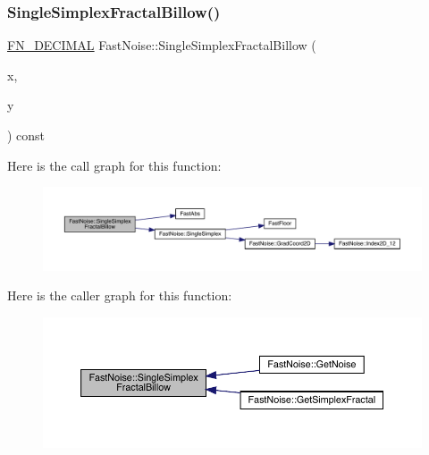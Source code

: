 \subsubsection{\texorpdfstring{Single\+Simplex\+Fractal\+Billow()}{SingleSimplexFractalBillow()}\hspace{0.1cm}{\footnotesize\ttfamily [1/2]}}
{\footnotesize\ttfamily \mbox{\hyperlink{_fast_noise_8h_a75a9ef6d2541c4921815b885bfd449c3}{F\+N\+\_\+\+D\+E\+C\+I\+M\+AL}} Fast\+Noise\+::\+Single\+Simplex\+Fractal\+Billow (\begin{DoxyParamCaption}\item[{\mbox{\hyperlink{_fast_noise_8h_a75a9ef6d2541c4921815b885bfd449c3}{F\+N\+\_\+\+D\+E\+C\+I\+M\+AL}}}]{x,  }\item[{\mbox{\hyperlink{_fast_noise_8h_a75a9ef6d2541c4921815b885bfd449c3}{F\+N\+\_\+\+D\+E\+C\+I\+M\+AL}}}]{y }\end{DoxyParamCaption}) const\hspace{0.3cm}{\ttfamily [private]}}

Here is the call graph for this function\+:
\nopagebreak
\begin{figure}[H]
\begin{center}
\leavevmode
\includegraphics[width=350pt]{d1/dd8/class_fast_noise_aa23a186cee489865781430d344cad11d_cgraph}
\end{center}
\end{figure}
Here is the caller graph for this function\+:
\nopagebreak
\begin{figure}[H]
\begin{center}
\leavevmode
\includegraphics[width=350pt]{d1/dd8/class_fast_noise_aa23a186cee489865781430d344cad11d_icgraph}
\end{center}
\end{figure}
\mbox{\label{class_fast_noise_a6dd57ba17192a085544452db30caaf64}} 

